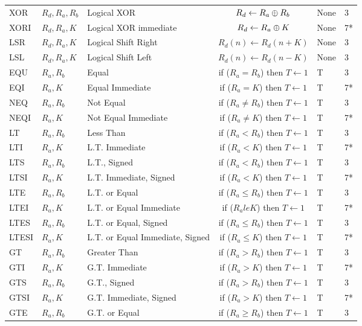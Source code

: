 \documentclass[12pt,twoside]{report}
\begin{document}
{\begin{longtable}{ | l | l | l | c | l | l | }
XOR & $R_d, R_a, R_b$ & Logical XOR & $R_d \leftarrow R_a \mathbin{\oplus} R_b $ & None & 3 \\
XORI & $R_d, R_a, K$ & Logical XOR immediate & $R_d \leftarrow R_a \mathbin{\oplus} K $ & None & 7* \\
LSR & $R_d, R_a, K$ & Logical Shift Right & $R_d(n) \leftarrow R_d(n + K) $ & None & 3 \\
LSL & $R_d, R_a, K$ & Logical Shift Left & $R_d(n) \leftarrow R_d(n - K) $ & None & 3 \\
EQU & $R_a, R_b$ & Equal & if ($R_a = R_b$) then $T \leftarrow 1$ & T & 3 \\
EQI & $R_a, K$ & Equal Immediate & if ($R_a = K$) then $T \leftarrow 1$ & T & 7* \\
NEQ & $R_a, R_b$ & Not Equal & if ($R_a \neq R_b$) then $T \leftarrow 1$ & T & 3 \\
NEQI & $R_a, K$ & Not Equal Immediate & if ($R_a \neq K$) then $T \leftarrow 1$ & T & 7* \\
LT & $R_a, R_b$ & Less Than & if ($R_a < R_b$) then $T \leftarrow 1$ & T & 3 \\
LTI & $R_a, K$ & L.T. Immediate & if ($R_a < K$) then $T \leftarrow 1$ & T & 7* \\
LTS & $R_a, R_b$ & L.T., Signed & if ($R_a < R_b$) then $T \leftarrow 1$ & T & 3 \\
LTSI & $R_a, K$ & L.T. Immediate, Signed & if ($R_a < K$) then $T \leftarrow 1$ & T & 7* \\
LTE & $R_a, R_b$ & L.T. or Equal & if ($R_a \le R_b$) then $T \leftarrow 1$ & T & 3 \\
LTEI & $R_a, K$ & L.T. or Equal Immediate & if ($R_a le K$) then $T \leftarrow 1$ & T & 7* \\
LTES & $R_a, R_b$ & L.T. or Equal, Signed & if ($R_a \le R_b$) then $T \leftarrow 1$ & T & 3 \\
LTESI & $R_a, K$ & L.T. or Equal Immediate, Signed & if ($R_a \le K$) then $T \leftarrow 1$ & T & 7* \\
GT & $R_a, R_b$ & Greater Than & if ($R_a > R_b$) then $T \leftarrow 1$ & T & 3 \\
GTI & $R_a, K$ & G.T. Immediate & if ($R_a > K$) then $T \leftarrow 1$ & T & 7* \\
GTS & $R_a, R_b$ & G.T., Signed & if ($R_a > R_b$) then $T \leftarrow 1$ & T & 3 \\
GTSI & $R_a, K$ & G.T. Immediate, Signed & if ($R_a > K$) then $T \leftarrow 1$ & T & 7* \\
GTE & $R_a, R_b$ & G.T. or Equal & if ($R_a \ge R_b$) then $T \leftarrow 1$ & T & 3 \\

\end{longtable}}
\end{document}

